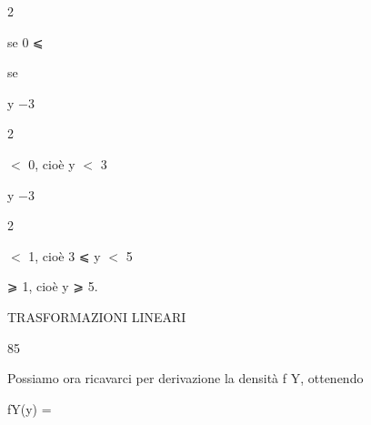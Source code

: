 \documentclass[a4paper,portrait,12pt]{article}
\begin{document}
2





\begin{flushleft}
se 0 ⩽
\end{flushleft}


\begin{flushleft}
se
\end{flushleft}





\begin{flushleft}
y $-$3
\end{flushleft}


2





\begin{flushleft}
$<$ 0, cio\`{e} y $<$ 3
\end{flushleft}


\begin{flushleft}
y $-$3
\end{flushleft}


2





\begin{flushleft}
$<$ 1, cio\`{e} 3 ⩽ y $<$ 5
\end{flushleft}





\begin{flushleft}
⩾ 1, cio\`{e} y ⩾ 5.
\end{flushleft}





\begin{flushleft}
 TRASFORMAZIONI LINEARI
\end{flushleft}





85





\begin{flushleft}
Possiamo ora ricavarci per derivazione la densit\`{a} f Y, ottenendo
\end{flushleft}


\begin{flushleft}
fY(y) =
\end{flushleft}
\end{document}
